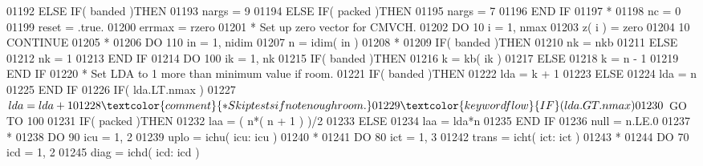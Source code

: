 \begin{DoxyCode}
01192       \textcolor{keywordflow}{ELSE} \textcolor{keywordflow}{IF}( banded )\textcolor{keywordflow}{THEN}
01193          nargs = 9
01194       \textcolor{keywordflow}{ELSE} \textcolor{keywordflow}{IF}( packed )\textcolor{keywordflow}{THEN}
01195          nargs = 7
01196 \textcolor{keywordflow}{      END IF}
01197 \textcolor{comment}{*}
01198       nc = 0
01199       reset = .true.
01200       errmax = rzero
01201 \textcolor{comment}{*     Set up zero vector for CMVCH.}
01202       \textcolor{keywordflow}{DO} 10 i = 1, nmax
01203          z( i ) = zero
01204    10 \textcolor{keywordflow}{CONTINUE}
01205 \textcolor{comment}{*}
01206       \textcolor{keywordflow}{DO} 110 in = 1, nidim
01207          n = idim( in )
01208 \textcolor{comment}{*}
01209          \textcolor{keywordflow}{IF}( banded )\textcolor{keywordflow}{THEN}
01210             nk = nkb
01211          \textcolor{keywordflow}{ELSE}
01212             nk = 1
01213 \textcolor{keywordflow}{         END IF}
01214          \textcolor{keywordflow}{DO} 100 ik = 1, nk
01215             \textcolor{keywordflow}{IF}( banded )\textcolor{keywordflow}{THEN}
01216                k = kb( ik )
01217             \textcolor{keywordflow}{ELSE}
01218                k = n - 1
01219 \textcolor{keywordflow}{            END IF}
01220 \textcolor{comment}{*           Set LDA to 1 more than minimum value if room.}
01221             \textcolor{keywordflow}{IF}( banded )\textcolor{keywordflow}{THEN}
01222                lda = k + 1
01223             \textcolor{keywordflow}{ELSE}
01224                lda = n
01225 \textcolor{keywordflow}{            END IF}
01226             \textcolor{keywordflow}{IF}( lda.LT.nmax )
01227      $         lda = lda + 1
01228 \textcolor{comment}{*           Skip tests if not enough room.}
01229             \textcolor{keywordflow}{IF}( lda.GT.nmax )
01230      $         \textcolor{keywordflow}{GO TO} 100
01231             \textcolor{keywordflow}{IF}( packed )\textcolor{keywordflow}{THEN}
01232                laa = ( n*( n + 1 ) )/2
01233             \textcolor{keywordflow}{ELSE}
01234                laa = lda*n
01235 \textcolor{keywordflow}{            END IF}
01236             null = n.LE.0
01237 \textcolor{comment}{*}
01238             \textcolor{keywordflow}{DO} 90 icu = 1, 2
01239                uplo = ichu( icu: icu )
01240 \textcolor{comment}{*}
01241                \textcolor{keywordflow}{DO} 80 ict = 1, 3
01242                   trans = icht( ict: ict )
01243 \textcolor{comment}{*}
01244                   \textcolor{keywordflow}{DO} 70 icd = 1, 2
01245                      diag = ichd( icd: icd )

\end{DoxyCode}
